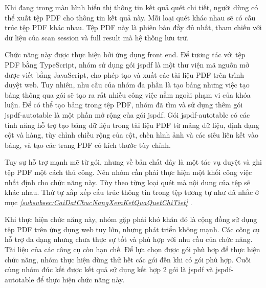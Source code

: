 \tab Khi đang trong màn hình hiển thị thông tin kết quả quét chi tiết, người dùng có thể xuất tệp PDF cho thông tin kết quả này.
Mỗi loại quét khác nhau sẽ có cấu trúc tệp PDF khác nhau.
Tệp PDF này là phiên bản đầy đủ nhất, tham chiếu với dữ liệu của scan session và full result mà hệ thống lưu trữ.

Chức năng này được thực hiện bởi ứng dụng front end.
Để tương tác với tệp PDF bằng TypeScript, nhóm sử dụng gói jspdf là một thư viện mã nguồn mở được viết bằng JavaScript, cho phép tạo và xuất các tài liệu PDF trên trình duyệt web.
Tuy nhiên, nhu cầu của nhóm đa phần là tạo bảng nhưng việc tạo bảng thông qua gói sẽ tạo ra rất nhiều công việc nằm ngoài phạm vi của khóa luận.
Để có thể tạo bảng trong tệp PDF, nhóm đã tìm và sử dụng thêm gói jspdf-autotable là một phần mở rộng của gói jspdf.
Gói jspdf-autotable có các tính năng hỗ trợ tạo bảng dữ liệu trong tài liệu PDF từ mảng dữ liệu, định dạng cột và hàng, tùy chỉnh chiều rộng của cột, chèn hình ảnh và các siêu liên kết vào bảng, và tạo các trang PDF có kích thước tùy chỉnh.

Tuy sự hỗ trợ mạnh mẽ từ gói, nhưng về bản chất đây là một tác vụ duyệt và ghi tệp PDF một cách thủ công.
Nên nhóm cần phải thực hiện một khối công việc nhất định cho chức năng này.
Tùy theo từng loại quét mà nội dung của tệp sẽ khác nhau.
Thứ tự xắp xếp cấu trúc thông tin trong tệp tương tự như đã nhắc ở mục \textit{\ref{subsubsec:CaiDatChucNangXemKetQuaQuetChiTiet} }.

Khi thực hiện chức năng này, nhóm gặp phải khó khăn đó là cộng đồng sử dụng tệp PDF trên ứng dụng web tuy lớn, nhưng phát triển không mạnh. Các công cụ hỗ trợ đa dạng nhưng chưa thực sự tốt và phù hợp với nhu cầu của chức năng. Tài liệu của các công cụ còn hạn chế. Để lựa chọn được gói phù hợp để thực hiện chức năng, nhóm thực hiện dùng thử hết các gói đến khi có gói phù hợp. Cuối cùng nhóm đúc kết được kết quả sử dụng kết hợp 2 gói là jspdf và jspdf-autotable để thực hiện chức năng này.